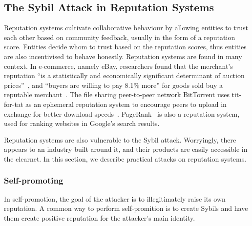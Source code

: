 \subsection{The Sybil Attack in Reputation Systems}
\label{sec:reputation-attack}
Reputation systems cultivate collaborative behaviour by allowing entities to
trust each other based on community feedback, usually in the form of a
reputation score. Entities decide whom to trust based on the reputation scores,
thus entities are also incentivised to behave honestly. Reputation systems are
found in many context. In e-commerce, namely eBay, researchers found that the
merchant's reputation ``is a statistically and economically significant
determinant of auction prices''~\cite{houser2006reputation}, and ``buyers are
willing to pay 8.1\% more'' for goods sold buy a reputable
merchant~\cite{resnick2006value}. The file sharing peer-to-peer network
BitTorrent uses tit-for-tat as an ephemeral reputation system to encourage peers
to upload in exchange for better download speeds~\cite{cohen2003incentives}.
PageRank~\cite{page1999pagerank} is also a reputation system, used for ranking
websites in Google's search results.

Reputation systems are also vulnerable to the Sybil attack. Worryingly, there
appears to an industry built around it, and their products are easily accessible
in the clearnet. In this section, we describe practical attacks on reputation
systems.

\subsubsection{Self-promoting}
In self-promotion, the goal of the attacker is to illegitimately raise its own
reputation. A common way to perform self-promition is to create Sybils and have
them create positive reputation for the attacker's main identity.

\begin{comment}
Dini and Spagnolo studied the economics of buying reputation on eBay. The
authors discovered many cheap items (around \euro{0.7}) for sell are simply there to
boost feedback. For example, one of the item is titled ``Apple Cranberry Crisp
Recipe + 100\% Positive Feedback''. The authors successfully boosted their
feedback by purchasing such items. But they made an unsuccessful attempted to
place a bid on their own good with a fake account~\cite{dini2009buying}.
\end{comment}


